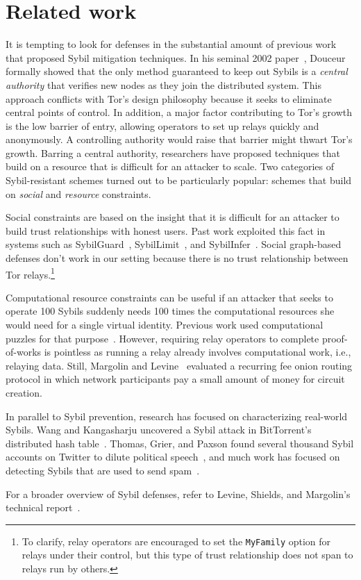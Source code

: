 \section{Related work}
\label{sec:related_work}
It is tempting to look for defenses in the substantial amount of previous work
that proposed Sybil mitigation techniques.  In his seminal 2002
paper~\cite{Douceur2002a}, Douceur formally showed that the only method
guaranteed to keep out Sybils is a \emph{central authority} that verifies new
nodes as they join the distributed system.  This approach conflicts with Tor's
design philosophy because it seeks to eliminate central points of control.  In
addition, a major factor contributing to Tor's growth is the low barrier of
entry, allowing operators to set up relays quickly and anonymously.  A
controlling authority would raise that barrier might thwart Tor's growth.
Barring a central authority, researchers have proposed techniques that build on
a resource that is difficult for an attacker to scale.  Two categories of
Sybil-resistant schemes turned out to be particularly popular: schemes that
build on \emph{social} and \emph{resource} constraints.  

Social constraints are based on the insight that it is difficult for an attacker
to build trust relationships with honest users.  Past work exploited this fact
in systems such as SybilGuard~\cite{Yu2006a}, SybilLimit~\cite{Yu2008a}, and
SybilInfer~\cite{Danezis2009a}.  Social graph-based defenses don't work in our
setting because there is no trust relationship between Tor relays.\footnote{To
clarify, relay operators are encouraged to set the \texttt{MyFamily} option
for relays under their control, but this type of trust relationship does not
span to relays run by others.}

Computational resource constraints can be useful if an attacker that seeks to
operate 100 Sybils suddenly needs 100 times the computational resources she
would need for a single virtual identity.  Previous work used computational
puzzles for that purpose~\cite{Borisov2006a,Li2012a}.  However, requiring relay
operators to complete proof-of-works is pointless as running a relay already
involves computational work, i.e., relaying data.  Still, Margolin and
Levine~\cite{Margolin2008a} evaluated a recurring fee onion routing protocol in
which network participants pay a small amount of money for circuit creation.

In parallel to Sybil prevention, research has focused on characterizing
real-world Sybils.  Wang and Kangasharju uncovered a Sybil attack in
BitTorrent's distributed hash table~\cite{Wang2012a}.  Thomas, Grier, and Paxson
found several thousand Sybil accounts on Twitter to dilute political
speech~\cite{Thomas2012a}, and much work has focused on detecting Sybils that
are used to send spam~\cite{Gao2010a}.

For a broader overview of Sybil defenses, refer to Levine, Shields, and
Margolin's technical report~\cite{Levine2006a}.
